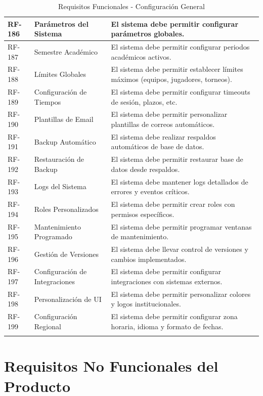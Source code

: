 \documentclass[12pt,a4paper]{article}
\begin{document}
\begin{longtable}{|>{\centering\arraybackslash}p{1.5cm}|>{\raggedright\arraybackslash}p{3.5cm}|>{\raggedright\arraybackslash}p{9cm}|}
RF-186 & Parámetros del Sistema & El sistema debe permitir configurar parámetros globales. \\
\hline
\rowcolor{rowgray}
RF-187 & Semestre Académico & El sistema debe permitir configurar periodos académicos activos. \\
\hline
RF-188 & Límites Globales & El sistema debe permitir establecer límites máximos (equipos, jugadores, torneos). \\
\hline
\rowcolor{rowgray}
RF-189 & Configuración de Tiempos & El sistema debe permitir configurar timeouts de sesión, plazos, etc. \\
\hline
RF-190 & Plantillas de Email & El sistema debe permitir personalizar plantillas de correos automáticos. \\
\hline
\rowcolor{rowgray}
RF-191 & Backup Automático & El sistema debe realizar respaldos automáticos de base de datos. \\
\hline
RF-192 & Restauración de Backup & El sistema debe permitir restaurar base de datos desde respaldos. \\
\hline
\rowcolor{rowgray}
RF-193 & Logs del Sistema & El sistema debe mantener logs detallados de errores y eventos críticos. \\
\hline
RF-194 & Roles Personalizados & El sistema debe permitir crear roles con permisos específicos. \\
\hline
\rowcolor{rowgray}
RF-195 & Mantenimiento Programado & El sistema debe permitir programar ventanas de mantenimiento. \\
\hline
RF-196 & Gestión de Versiones & El sistema debe llevar control de versiones y cambios implementados. \\
\hline
\rowcolor{rowgray}
RF-197 & Configuración de Integraciones & El sistema debe permitir configurar integraciones con sistemas externos. \\
\hline
RF-198 & Personalización de UI & El sistema debe permitir personalizar colores y logos institucionales. \\
\hline
\rowcolor{rowgray}
RF-199 & Configuración Regional & El sistema debe permitir configurar zona horaria, idioma y formato de fechas. \\
\hline
\caption{Requisitos Funcionales - Configuración General}
\end{longtable}

\newpage

\section{Requisitos No Funcionales del Producto}
\end{document}
